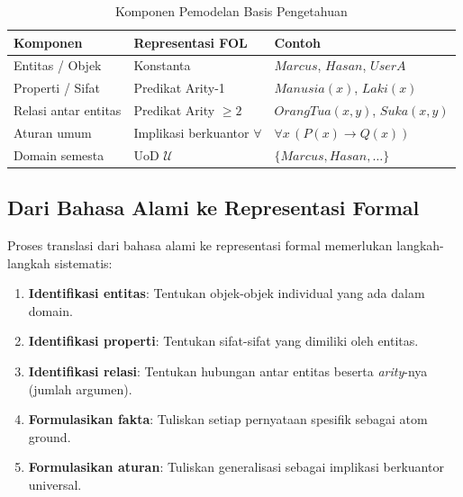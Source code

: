 \begin{table}[htbp]
\centering
\small
\renewcommand{\arraystretch}{1.3}
\begin{tabular}{|p{2.7cm}|p{3.6cm}|p{4.8cm}|}
\hline
\textbf{Komponen} & \textbf{Representasi FOL} & \textbf{Contoh} \\ \hline
Entitas / Objek & Konstanta & $Marcus$, $Hasan$, $UserA$ \\ \hline
Properti / Sifat & Predikat Arity-1 & $Manusia(x)$, $Laki(x)$ \\ \hline
Relasi antar entitas & Predikat Arity $\geq 2$ & $OrangTua(x,y)$, $Suka(x,y)$ \\ \hline
Aturan umum & Implikasi berkuantor $\forall$ & $\forall x\, (P(x) \rightarrow Q(x))$ \\ \hline
Domain semesta & UoD $\mathcal{U}$ & $\{Marcus, Hasan, \ldots\}$ \\ \hline
\end{tabular}
\caption{Komponen Pemodelan Basis Pengetahuan}
\label{tab:komponen-kb}
\end{table}

\subsection{Dari Bahasa Alami ke Representasi Formal}

Proses translasi dari bahasa alami ke representasi formal memerlukan langkah-langkah sistematis:

\begin{enumerate}
    \item \textbf{Identifikasi entitas}: Tentukan objek-objek individual yang ada dalam domain.
    \item \textbf{Identifikasi properti}: Tentukan sifat-sifat yang dimiliki oleh entitas.
    \item \textbf{Identifikasi relasi}: Tentukan hubungan antar entitas beserta \textit{arity}-nya (jumlah argumen).
    \item \textbf{Formulasikan fakta}: Tuliskan setiap pernyataan spesifik sebagai atom ground.
    \item \textbf{Formulasikan aturan}: Tuliskan generalisasi sebagai implikasi berkuantor universal.
\end{enumerate}

